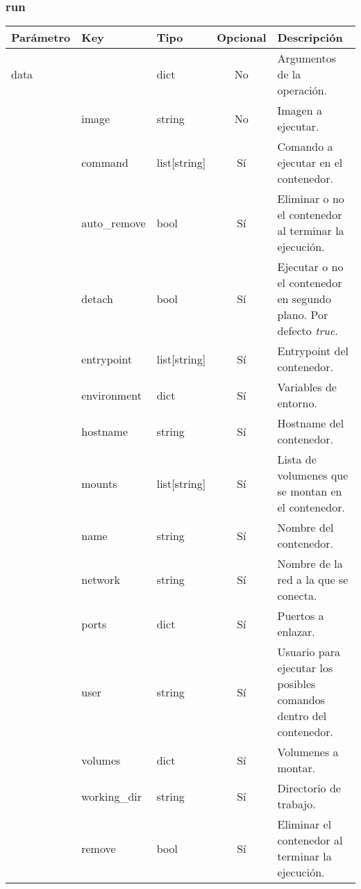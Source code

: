 		\subsubsection{run}
			\begin{table}[h!]
				\centering
	\begin{adjustbox}{max width=\textwidth}
				\begin{tabularx}{\linewidth}{|l|l|l|c|L|}
					\hline
					Parámetro & Key & Tipo & Opcional & Descripción \\ \hline
					data &  & dict & No & Argumentos de la operación. \\ \hline
					& image & string & No & Imagen a ejecutar. \\ \hline
					& command & list[string] & Sí & Comando a ejecutar en el contenedor. \\ \hline
					& auto\_remove & bool & Sí & Eliminar o no el contenedor al terminar la ejecución. \\ \hline
					& detach & bool & Sí & Ejecutar o no el contenedor en segundo plano. Por defecto \textit{true}. \\ \hline
					& entrypoint & list[string] & Sí & Entrypoint del contenedor. \\ \hline
					& environment & dict & Sí & Variables de entorno. \\ \hline
					& hostname & string & Sí & Hostname del contenedor. \\ \hline
					& mounts & list[string] & Sí & Lista de volumenes que se montan en el contenedor. \\ \hline
					& name & string & Sí & Nombre del contenedor. \\ \hline
					& network & string & Sí & Nombre de la red a la que se conecta. \\ \hline
					& ports & dict & Sí & Puertos a enlazar. \\ \hline
					& user & string & Sí & Usuario para ejecutar los posibles comandos dentro del contenedor. \\ \hline
					& volumes & dict & Sí & Volumenes a montar. \\ \hline
					& working\_dir & string & Sí & Directorio de trabajo. \\ \hline
					& remove & bool & Sí & Eliminar el contenedor al terminar la ejecución. \\ \hline
				\end{tabularx}
\end{adjustbox}
			\end{table}
		
